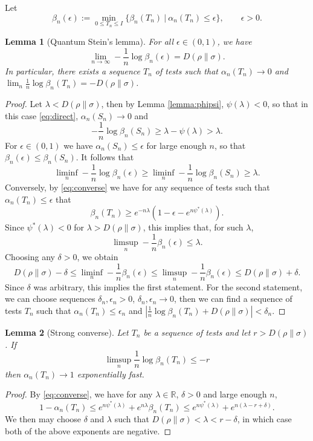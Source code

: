 \documentclass[12pt]{article}
\newtheorem{lemma}{Lemma}
\theoremstyle{definition}
\theoremstyle{remark}
\begin{document}
Let 
\[
\beta_n(\epsilon):=\min_{0\le T_n\le I}\{\beta_n(T_n)\ | \ \alpha_n(T_n)\le
\epsilon\},\qquad \epsilon>0.
\]

\begin{lemma}[Quantum Stein's lemma]\label{lemma:stein}\cite{hiai1991theproper,ogawa2000strong} For all $\epsilon\in (0,1)$, we have
\[
\lim_{n\to\infty} -\frac1n \log \beta_n(\epsilon)= D(\rho\|\sigma).
\]
In particular, there exists a sequence $T_n$ of tests such that $\alpha_n(T_n)\to 0$ and
$\lim_n \frac1n\log\beta_n(T_n)= -D(\rho\|\sigma)$.
\end{lemma}
\begin{proof} Let $\lambda<D(\rho\|\sigma)$, then by Lemma \ref{lemma:phipsi},
$\psi(\lambda)<0$, so that in this case \eqref{eq:direct}, $\alpha_n(S_n)\to 0$ and 
\[
-\frac1n\log \beta_n(S_n)\ge \lambda -\psi(\lambda)>\lambda.
\]
For $\epsilon\in (0,1)$ we have $\alpha_n(S_n)\le \epsilon$ for large enough $n$, so that 
$\beta_n(\epsilon)\le \beta_n(S_n)$. It follows that
\[
\liminf_n -\frac1n\log\beta_n(\epsilon)\ge \liminf_n -\frac1n\log \beta_n(S_n)\ge \lambda.
\]
Conversely, by \eqref{eq:converse} we have for any sequence of
tests such that $\alpha_n(T_n)\le \epsilon$ that
\[
\beta_n(T_n)\ge e^{-n\lambda}(1-\epsilon-e^{n\psi^*(\lambda)}).
\]
Since $\psi^*(\lambda)<0$ for  $\lambda>D(\rho\|\sigma)$, this implies that, for such
$\lambda$,
\[
\limsup_n -\frac1n\beta_n(\epsilon)\le \lambda.
\]
Choosing any $\delta>0$, we obtain
\[
D(\rho\|\sigma)-\delta\le \liminf_n-\frac1n\beta_n(\epsilon)\le
\limsup_n-\frac1n\beta_n(\epsilon)\le D(\rho\|\sigma)+\delta.
\]
Since $\delta$ was arbitrary, this implies the first statement. For the second statement,
 we can choose sequences $\delta_n,\epsilon_n>0$, $\delta_n,\epsilon_n\to 0$, then we can
 find a sequence of tests $T_n$ such that $\alpha_n(T_n)\le \epsilon_n$ and
 $|\frac1n\log\beta_n(T_n)+D(\rho\|\sigma)|<\delta_n$. 

\end{proof}

\begin{lemma}[Strong converse] \cite{ogawa2000strong} \label{lemma:converse}
Let $T_n$ be a sequence of tests and let $r>D(\rho\|\sigma)$. If
\[
\limsup_n \frac1n\log\beta_n(T_n)\le -r
\]
then  $\alpha_n(T_n)\to 1$ exponentially fast.

\end{lemma}

\begin{proof}
By \eqref{eq:converse}, we have for any $\lambda\in \mathbb R$, $\delta>0$ and large enough $n$,
\[
1-\alpha_n(T_n)\le e^{n\psi^*(\lambda)}+e^{n\lambda}\beta_n(T_n)\le
e^{n\psi^*(\lambda)}+e^{n(\lambda-r+\delta)}.
\]
We then may choose $\delta$ and $\lambda$ such that $D(\rho\|\sigma)<\lambda<r-\delta$, in
which case both of the above exponents are negative.

\end{proof}
\end{document}
